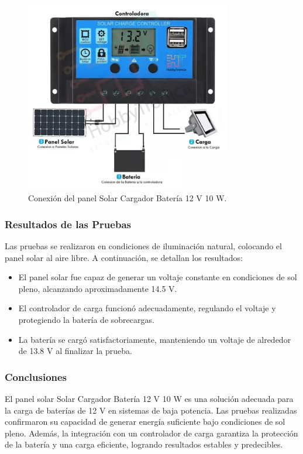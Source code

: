 \begin{figure}[h]
    \centering
    \includegraphics[width=0.8\textwidth]{./Figures/Pruebas/conexion_panel_solar.png}
    \caption{Conexión del panel Solar Cargador Batería 12 V 10 W.}
    \label{fig:conexionPanel}
\end{figure}


\subsubsection{Resultados de las Pruebas}
Las pruebas se realizaron en condiciones de iluminación natural, colocando el panel solar al aire libre. A continuación, se detallan los resultados:

\begin{itemize}
    \item El panel solar fue capaz de generar un voltaje constante en condiciones de sol pleno, alcanzando aproximadamente 14.5 V.
    \item El controlador de carga funcionó adecuadamente, regulando el voltaje y protegiendo la batería de sobrecargas.
    \item La batería se cargó satisfactoriamente, manteniendo un voltaje de alrededor de 13.8 V al finalizar la prueba.
\end{itemize}

\subsubsection{Conclusiones}
El panel solar Solar Cargador Batería 12 V 10 W es una solución adecuada para la carga de baterías de 12 V en sistemas de baja potencia. Las pruebas realizadas confirmaron su capacidad de generar energía suficiente bajo condiciones de sol pleno. Además, la integración con un controlador de carga garantiza la protección de la batería y una carga eficiente, logrando resultados estables y predecibles.

